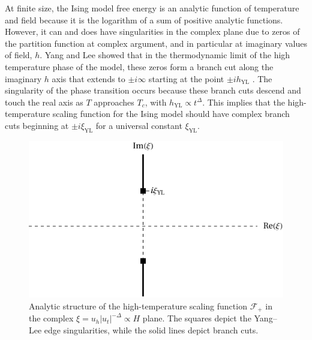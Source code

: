 \documentclass[
aps,
pre,
preprint,
longbibliography,
floatfix
]{revtex4-2}
\begin{document}
At finite size, the Ising model free energy is an analytic function of
temperature and field because it is the logarithm of a sum of positive analytic
functions. However, it can and does have singularities in the complex plane due
to zeros of the partition function at complex argument, and in particular at
imaginary values of field, $h$. Yang and Lee showed that in the thermodynamic
limit of the high temperature phase of the model, these zeros form a branch cut
along the imaginary $h$ axis that extends to $\pm i\infty$ starting at the
point $\pm ih_{\mathrm{YL}}$ \cite{Yang_1952_Statistical, Lee_1952_Statistical}.
The singularity of the phase transition occurs because these branch cuts
descend and touch the real axis as $T$ approaches $T_c$, with
$h_{\mathrm{YL}}\propto t^{\Delta}$. This implies that the
high-temperature scaling function for the Ising model should have complex
branch cuts beginning at $\pm i\xi_{\mathrm{YL}}$ for a universal constant
$\xi_{\mathrm{YL}}$.

\begin{figure}
  \includegraphics{figs/F_higher_singularities.pdf}
  \caption{
    Analytic structure of the high-temperature scaling function $\mathcal F_+$
    in the complex $\xi=u_h|u_t|^{-\Delta}\propto H$ plane. The squares
    depict the Yang--Lee edge singularities, while the solid lines depict
    branch cuts.
  } \label{fig:higher.singularities}
\end{figure}
\end{document}
